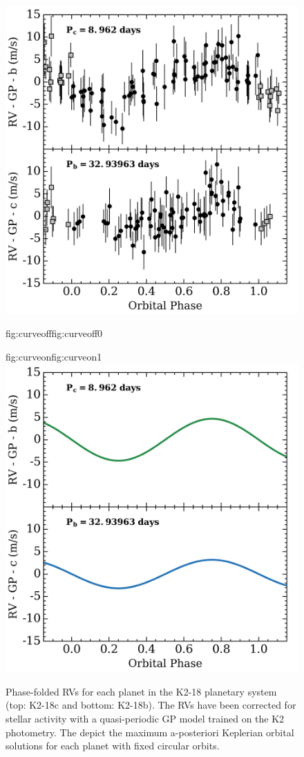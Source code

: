 \begin{figure}
  \centering
  \includegraphics[width=0.8\hsize]{figures/phasedRVs_data.png}%
   \hspace{-0.8\hsize}%
  \begin{ocg}{fig:curveoff}{fig:curveoff}{0}%
  \end{ocg}%
  \begin{ocg}{fig:curveon}{fig:curveon}{1}%
   \includegraphics[width=0.8\hsize]{figures/phasedRVs_curves.png}%
  \end{ocg}
  \hspace{-0.8\hsize}%
  \caption[Phase-folded HARPS RVs depicting the planetary signals from K2-18b and c.]
      {\small Phase-folded RVs for each planet in the K2-18
  planetary system (top: K2-18c and bottom: K2-18b). The RVs have
  been corrected for stellar activity with a quasi-periodic GP
  model trained on the K2 photometry.
  The 
  depict the maximum a-posteriori Keplerian orbital solutions for each planet
  with fixed circular orbits.}
  \label{k218fig:rvs}
\end{figure}


